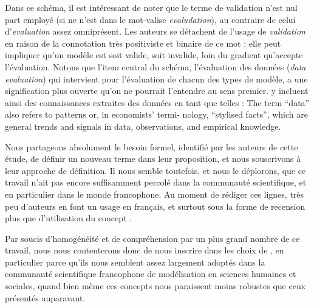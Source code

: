 Dans ce schéma, il est intéressant de noter que le terme de \og validation\fg{} n'est nul part employé (si ne n'est dans le mot-valise \textit{evaludation}), au contraire de celui d'\og \textit{evaluation}\fg{} assez omniprésent.
Les auteurs se détachent de l'usage de \og \textit{validation}\fg{} en raison de la connotation très positiviste et \og binaire\fg{} de ce mot : elle peut impliquer qu'un modèle est soit valide, soit invalide, loin du gradient qu'accepte l'évaluation.
Notons que l'item central du schéma, l'évaluation des données (\textit{data evaluation}) qui intervient pour l'évaluation de chacun des types de modèle, a une signification plus ouverte qu'on ne pourrait l'entendre au sens premier.
\textcite[121]{augusiak_merging_2014} y incluent ainsi des connaissances extraites des données en tant que telles : \og The term ``data'' also refers
to patterns \autocite{grimm_pattern-oriented_2012} or, in economists' termi-
nology, ``stylised facts'', which are general trends and signals in data,
observations, and empirical knowledge.\fg{}

Nous partageons absolument le besoin formel, identifié par les auteurs de cette étude, de définir un nouveau terme dans leur proposition, et nous souscrivons à leur approche de définition.
Il nous semble toutefois, et nous le déplorons, que ce travail n'ait pas encore suffisamment percolé dans la communauté scientifique, et en particulier dans le monde francophone.
Au moment de rédiger ces lignes, très peu d'auteurs en font un usage en français, et surtout sous la forme de recension plus que d'utilisation du concept \autocite[par exemple][89,436]{rey-coyrehourcq_plateforme_2015}.

Par soucis d'homogénéité et de compréhension par un plus grand nombre de ce travail, nous nous contenterons donc de nous inscrire dans les choix de \textcite[voir \cref{enc:lexique-eval-amblard}]{amblard_evaluation_2006}, en particulier parce qu'ils nous semblent assez largement adoptés dans la communauté scientifique francophone de modélisation en sciences humaines et sociales, quand bien même ces concepts nous paraissent moins robustes que ceux présentés auparavant.

